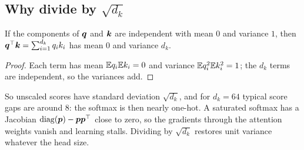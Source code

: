 \subsection{Why divide by $\sqrt{d_k}$}
\begin{proposition}
	If the components of $\bm{q}$ and $\bm{k}$ are independent with mean $0$ and variance $1$, then
	$\bm{q}^{\top}\bm{k}=\sum_{i=1}^{d_k}q_ik_i$ has mean $0$ and variance $d_k$.
\end{proposition}
\begin{proof}
	Each term has mean $\mathbb{E} q_i\mathbb{E} k_i=0$ and variance $\mathbb{E} q_i^2\mathbb{E} k_i^2=1$; the $d_k$ terms are
	independent, so the variances add.
\end{proof}
So unscaled scores have standard deviation $\sqrt{d_k}$, and for $d_k=64$ typical score gaps are
around $8$: the softmax is then nearly one-hot. A saturated softmax has a Jacobian
$\operatorname{diag}(\bm p)-\bm p\bm p^{\top}$ close to zero, so the gradients through the attention weights vanish and
learning stalls. Dividing by $\sqrt{d_k}$ restores unit variance whatever the head size.

